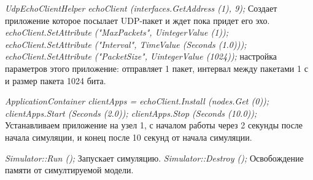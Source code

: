 \documentclass[14pt,a4paper]{article}
\begin{document}
\textit{UdpEchoClientHelper echoClient (interfaces.GetAddress (1), 9);} Создает
приложение которое посылает UDP-пакет и ждет пока придет его эхо.
\textit{echoClient.SetAttribute ("MaxPackets", UintegerValue (1));
echoClient.SetAttribute ("Interval", TimeValue (Seconds (1.0)));
echoClient.SetAttribute ("PacketSize", UintegerValue (1024));} настройка
параметров этого приложение: отправляет 1 пакет, интервал между пакетами 1 с и
размер пакета 1024 бита.

\textit{ApplicationContainer clientApps = echoClient.Install (nodes.Get (0));
  clientApps.Start (Seconds (2.0));
  clientApps.Stop (Seconds (10.0));} Устанавливаем приложение на узел 1, с
  началом работы через 2 секунды после начала симуляции, и конец после 10 секунд
  от начала симуляции.
  
\textit{Simulator::Run ();} Запускает симуляцию.
\textit{Simulator::Destroy ();} Освобождение памяти от симултируемой модели.
  
\newpage
{}

\end{document}
